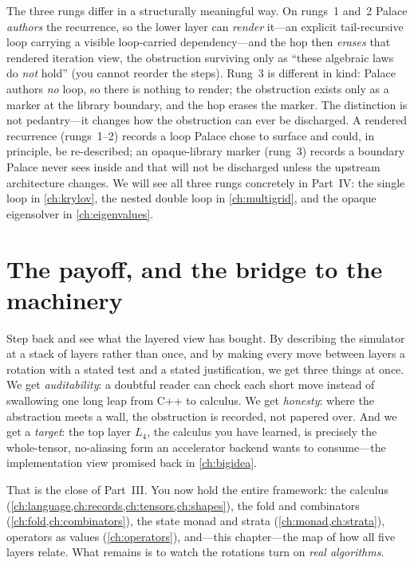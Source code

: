 The three rungs differ in a structurally meaningful way. On rungs~1 and~2 Palace
\emph{authors} the recurrence, so the lower layer can \emph{render} it---an
explicit tail-recursive loop carrying a visible loop-carried dependency---and the
hop then \emph{erases} that rendered iteration view, the obstruction surviving only
as ``these algebraic laws do \emph{not} hold'' (you cannot reorder the steps).
Rung~3 is different in kind: Palace authors \emph{no} loop, so there is nothing to
render; the obstruction exists only as a marker at the library boundary, and the
hop erases the marker. The distinction is not pedantry---it changes how the
obstruction can ever be discharged. A rendered recurrence (rungs~1--2) records a
loop Palace chose to surface and could, in principle, be re-described; an
opaque-library marker (rung~3) records a boundary Palace never sees inside and that
will not be discharged unless the upstream architecture changes. We will see all
three rungs concretely in Part~IV: the single loop in \cref{ch:krylov}, the nested
double loop in \cref{ch:multigrid}, and the opaque eigensolver in
\cref{ch:eigenvalues}.

\section{The payoff, and the bridge to the machinery}
\label{sec:payoff}

Step back and see what the layered view has bought. By describing the simulator at
a stack of layers rather than once, and by making every move between layers a
rotation with a stated test and a stated justification, we get three things at
once. We get \emph{auditability}: a doubtful reader can check each short move
instead of swallowing one long leap from C++ to calculus. We get \emph{honesty}:
where the abstraction meets a wall, the obstruction is recorded, not papered over.
And we get a \emph{target}: the top layer $L_4$, the calculus you have learned, is
precisely the whole-tensor, no-aliasing form an accelerator backend wants to
consume---the implementation view promised back in \cref{ch:bigidea}.

That is the close of Part~III. You now hold the entire framework: the calculus
(\cref{ch:language,ch:records,ch:tensors,ch:shapes}), the fold and combinators
(\cref{ch:fold,ch:combinators}), the state monad and strata
(\cref{ch:monad,ch:strata}), operators as values (\cref{ch:operators}), and---this
chapter---the map of how all five layers relate. What remains is to watch the
rotations turn on \emph{real algorithms}.


